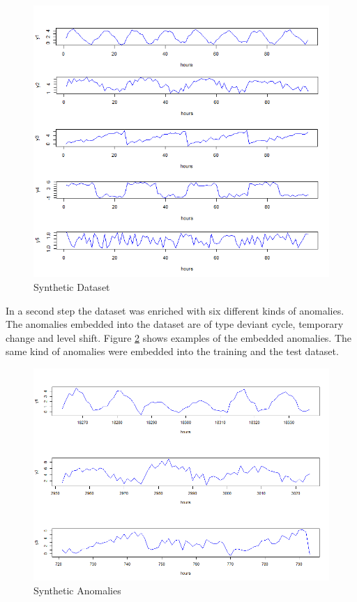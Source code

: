 \begin{figure}[h]
	\centering
	\includegraphics[scale=0.7]{Figures/synthetic data}
	\decoRule
	\caption[Synthetic Dataset]{Synthetic Dataset \parencite{own}}
	\label{fig:synthetic data}
\end{figure}

In a second step the dataset was enriched with six different kinds of anomalies. The anomalies embedded into the dataset are of type deviant cycle, temporary change and level shift. Figure \ref{fig:anomalies} shows examples of the embedded anomalies. The same kind of anomalies were embedded into the training and the test dataset.

\begin{figure}[h]
	\centering
	\includegraphics[scale=0.7]{Figures/Anomalies}
	\decoRule
	\caption[Synthetic Anomalies]{Synthetic Anomalies \parencite{own}}
	\label{fig:anomalies}
\end{figure}

